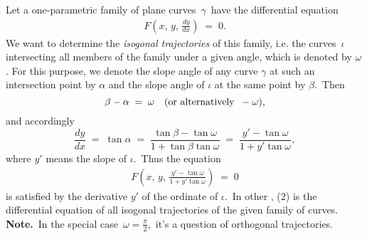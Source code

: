 \documentclass[12pt]{article}
\theoremstyle{definition}
\begin{document}
Let a one-parametric family of plane curves \,$\gamma$\, have the differential equation
\begin{align}
F(x,\,y,\,\frac{dy}{dx}) \;=\; 0.
\end{align}
We want to determine the \emph{isogonal trajectories} of this family, i.e. the curves \,$\iota$\, intersecting all members of the family under a given angle, which is denoted by $\omega$.
For this purpose, we denote the slope angle of any curve $\gamma$ at such an intersection point by $\alpha$ and the slope angle of $\iota$ at the same point by $\beta$.\, Then
$$\beta-\alpha \;=\; \omega  \quad(\mbox{or alternatively\;\;} -\omega),$$
and accordingly
$$\frac{dy}{dx} \;=\; \tan\alpha \;=\; \frac{\tan\beta-\tan\omega}{1+\tan\beta\tan\omega} 
\;=\; \frac{y'-\tan\omega}{1+y'\tan\omega},$$
where $y'$ means the slope of $\iota$.\, Thus the equation
\begin{align}
F(x,\,y,\,\frac{y'-\tan\omega}{1+y'\tan\omega}) \;=\; 0
\end{align}
is satisfied by the derivative $y'$ of the ordinate of $\iota$.\, In other , (2) is the differential equation of all isogonal trajectories of the given family of curves.\\

\textbf{Note.}\, In the special case \,$\omega = \frac{\pi}{2}$,\, it's a question of orthogonal trajectories.

\end{document}
